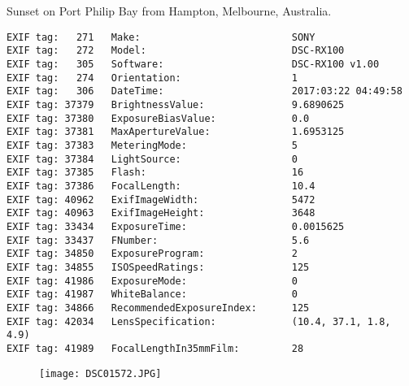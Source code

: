 \section{\protect{}}
\noindent Sunset on Port Philip Bay from Hampton, Melbourne, Australia.
\noindent
\begin{lstlisting}
EXIF tag:   271   Make:                          SONY
EXIF tag:   272   Model:                         DSC-RX100
EXIF tag:   305   Software:                      DSC-RX100 v1.00
EXIF tag:   274   Orientation:                   1
EXIF tag:   306   DateTime:                      2017:03:22 04:49:58
EXIF tag: 37379   BrightnessValue:               9.6890625
EXIF tag: 37380   ExposureBiasValue:             0.0
EXIF tag: 37381   MaxApertureValue:              1.6953125
EXIF tag: 37383   MeteringMode:                  5
EXIF tag: 37384   LightSource:                   0
EXIF tag: 37385   Flash:                         16
EXIF tag: 37386   FocalLength:                   10.4
EXIF tag: 40962   ExifImageWidth:                5472
EXIF tag: 40963   ExifImageHeight:               3648
EXIF tag: 33434   ExposureTime:                  0.0015625
EXIF tag: 33437   FNumber:                       5.6
EXIF tag: 34850   ExposureProgram:               2
EXIF tag: 34855   ISOSpeedRatings:               125
EXIF tag: 41986   ExposureMode:                  0
EXIF tag: 41987   WhiteBalance:                  0
EXIF tag: 34866   RecommendedExposureIndex:      125
EXIF tag: 42034   LensSpecification:             (10.4, 37.1, 1.8, 4.9)
EXIF tag: 41989   FocalLengthIn35mmFilm:         28

\end{lstlisting}
\clearpage
\begin{figure}
\raggedleft
\texttt{[image: DSC01572.JPG]}
\end{figure}


\clearpage
